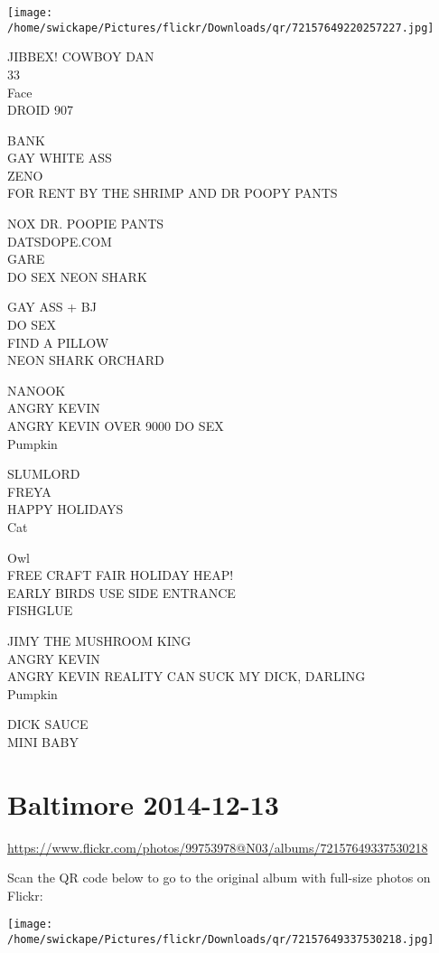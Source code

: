 \documentclass[10pt,letterpaper]{article}
\begin{document}
\texttt{[image: /home/swickape/Pictures/flickr/Downloads/qr/72157649220257227.jpg]}


JIBBEX! COWBOY DAN\\
33\\
Face\\
DROID 907

BANK\\
GAY WHITE ASS\\
ZENO\\
FOR RENT BY THE SHRIMP AND DR POOPY PANTS

NOX DR. POOPIE PANTS\\
DATSDOPE.COM\\
GARE\\
DO SEX NEON SHARK

GAY ASS + BJ\\
DO SEX\\
FIND A PILLOW\\
NEON SHARK ORCHARD

NANOOK\\
ANGRY KEVIN\\
ANGRY KEVIN OVER 9000 DO SEX\\
Pumpkin

SLUMLORD\\
FREYA\\
HAPPY HOLIDAYS\\
Cat

Owl\\
FREE CRAFT FAIR HOLIDAY HEAP!\\
EARLY BIRDS USE SIDE ENTRANCE\\
FISHGLUE

JIMY THE MUSHROOM KING\\
ANGRY KEVIN\\
ANGRY KEVIN REALITY CAN SUCK MY DICK, DARLING\\
Pumpkin

DICK SAUCE\\
MINI BABY


\section*{Baltimore 2014-12-13}

\url{https://www.flickr.com/photos/99753978@N03/albums/72157649337530218}

Scan the QR code below to go to the original album with full-size photos on Flickr:

\texttt{[image: /home/swickape/Pictures/flickr/Downloads/qr/72157649337530218.jpg]}
\end{document}
